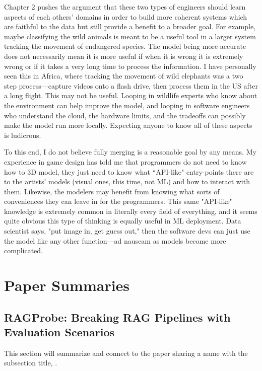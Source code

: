 \documentclass{article}
\begin{document}
Chapter 2 pushes the argument that these two types of engineers should learn aspects of each others' domains in order to build more coherent systems which are faithful to the data but still provide a benefit to a broader goal.
For example, maybe classifying the wild animals is meant to be a useful tool in a larger system tracking the movement of endangered species. 
The model being more accurate does not necessarily mean it is more useful if when it is wrong it is extremely wrong or if it takes a very long time to process the information.
I have personally seen this in Africa, where tracking the movement of wild elephants was a two step process—capture videos onto a flash drive, then process them in the US after a long flight. This may not be useful.
Looping in wildlife experts who know about the environment can help improve the model, and looping in software engineers who understand the cloud, the hardware limits, and the tradeoffs can possibly make the model run more locally.
Expecting anyone to know all of these aspects is ludicrous.

To this end, I do not believe fully merging is a reasonable goal by any means. 
My experience in game design has told me that programmers do not need to know how to 3D model, they just need to know what ``API-like" entry-points there are to the artists' models (visual ones, this time, not ML) and how to interact with them. Likewise, the modelers may benefit from knowing what sorts of conveniences they can leave in for the programmers.
This same "API-like" knowledge is extremely common in literally every field of everything, and it seems quite obvious this type of thinking is equally useful in ML deployment. 
Data scientist says, "put image in, get guess out," then the software devs can just use the model like any other function—ad nauseam as models become more complicated.

\section{Paper Summaries}

\subsection{RAGProbe: Breaking RAG Pipelines with Evaluation Scenarios}
This section will summarize and connect to the paper sharing a name with the subsection title, \citet{ragprobe}.
\end{document}
